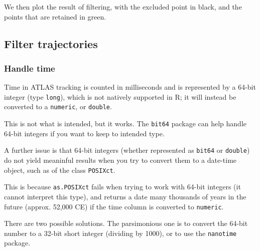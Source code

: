 \documentclass[]{scrartcl}
\newenvironment{Shaded}{}{}
\newcommand{\CommentTok}[1]{\textcolor[rgb]{0.38,0.63,0.69}{\textit{#1}}}
\newcommand{\DataTypeTok}[1]{\textcolor[rgb]{0.56,0.13,0.00}{#1}}
\newcommand{\DecValTok}[1]{\textcolor[rgb]{0.25,0.63,0.44}{#1}}
\newcommand{\KeywordTok}[1]{\textcolor[rgb]{0.00,0.44,0.13}{\textbf{#1}}}
\newcommand{\NormalTok}[1]{#1}
\newcommand{\OperatorTok}[1]{\textcolor[rgb]{0.40,0.40,0.40}{#1}}
\newcommand{\OtherTok}[1]{\textcolor[rgb]{0.00,0.44,0.13}{#1}}
\newcommand{\StringTok}[1]{\textcolor[rgb]{0.25,0.44,0.63}{#1}}
\begin{document}
We then plot the result of filtering, with the excluded point in black, and the points that are retained in green.

\begin{Shaded}
\end{Shaded}

\hypertarget{filter-trajectories}{%
\subsection{Filter trajectories}\label{filter-trajectories}}

\hypertarget{handle-time}{%
\subsubsection{Handle time}\label{handle-time}}

Time in ATLAS tracking is counted in milliseconds and is represented by a 64-bit integer (type \texttt{long}), which is not natively supported in R; it will instead be converted to a \texttt{numeric}, or \texttt{double}.

This is not what is intended, but it works. The \texttt{bit64} package can help handle 64-bit integers if you want to keep to intended type.

A further issue is that 64-bit integers (whether represented as \texttt{bit64} or \texttt{double}) do not yield meaninful results when you try to convert them to a date-time object, such as of the class \texttt{POSIXct}.

This is because \texttt{as.POSIXct} fails when trying to work with 64-bit integers (it cannot interpret this type), and returns a date many thousands of years in the future (approx. 52,000 CE) if the time column is converted to \texttt{numeric}.

There are two possible solutions. The parsimonious one is to convert the 64-bit number to a 32-bit short integer (dividing by 1000), or to use the \texttt{nanotime} package.
\end{document}
